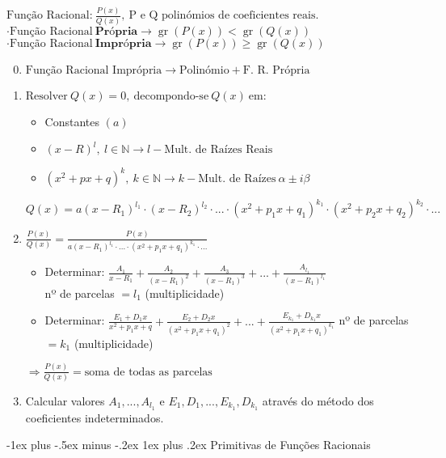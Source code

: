 \documentclass[10pt,landscape]{article}
\makeatletter
\DeclareMathOperator{\gr}{gr}
\renewcommand{\subsubsection}{\@startsection{subsubsection}{3}{0mm}%
                                {-1ex plus -.5ex minus -.2ex}%
                                {1ex plus .2ex}%
                                {\normalfont\small\bfseries}}
\makeatother
\begin{document}
\begin{multicols}{3}
$\text{Função Racional:}\ \frac{P(x)}{Q(x)},\ \text{P e Q polinómios de coeficientes reais.}$\\
$\cdot \text{Função Racional}\ \textbf{Própria} \to \gr(P(x)) < \gr(Q(x))$\\
$\cdot \text{Função Racional}\ \textbf{Imprópria} \to \gr(P(x)) \geq \gr(Q(x))$\\
\begin{enumerate}\setcounter{enumi}{-1}
\item $\text{Função Racional Imprópria} \to \text{Polinómio} + \text{F. R. Própria}$\\
\item $\text{Resolver}\ Q(x)=0,\ \text{decompondo-se}\ Q(x)\ \text{em}:$\\
\begin{itemize}\renewcommand{\labelitemi}{$-$}
\item Constantes $(a)$
\item $(x-R)^l,\ l \in \mathbb{N} \to l - \text{Mult. de Raízes Reais}$
\item $(x^2 + px + q)^k,\ k \in \mathbb{N} \to k - \text{Mult. de Raízes}\ \alpha \pm i\beta$
\end{itemize}
$Q(x) = a(x-R_1)^{l_1} \cdot (x-R_2)^{l_2} \cdot ... \cdot (x^2 + p_1x + q_1)^{k_1} \cdot (x^2+p_2x+q_2)^{k_2} \cdot ...$
\item $\frac{P(x)}{Q(x)} = \frac{P(x)}{a(x-R_1)^{l_1} \cdot ... \cdot (x^2 + p_1x + q_1)^{k_1} \cdot ...}$
\begin{itemize}\renewcommand{\labelitemi}{$-$}
\item Determinar: $\frac{A_1}{x-R_1}+\frac{A_2}{(x-R_1)^2}+\frac{A_3}{(x-R_1)^3}+...+	\frac{A_{l_1}}{(x-R_1)^{l_1}}$\\
nº de parcelas $= l_1$ (multiplicidade)
\item Determinar: $\frac{E_1+D_1x}{x^2+p_1x+q}+\frac{E_2+D_2x}{(x^2+p_1x+q_1)^2}+...+\frac{E_{k_1}+D_{k_1}x}{(x^2+p_1x+q_1)^{k_1}}$
nº de parcelas $= k_1$ (multiplicidade)
\end{itemize}
$\Longrightarrow \frac{P(x)}{Q(x)} = \text{soma de todas as parcelas}$\\
\item Calcular valores $A_1, ..., A_{l_1}$ e $E_1, D_1, ..., E_{k_1}, D_{k_1}$ através do método dos coeficientes indeterminados.
\end{enumerate}

\subsubsection{Primitivas de Funções Racionais}


\end{multicols}
\end{document}
